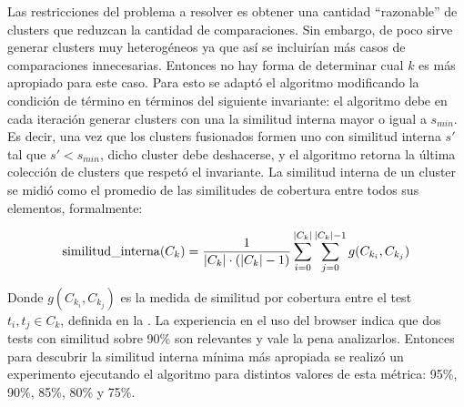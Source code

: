 
\par Las restricciones del problema a resolver es obtener una cantidad ``razonable'' de clusters que reduzcan la cantidad de comparaciones. Sin embargo, de poco sirve generar clusters muy heterogéneos ya que así se incluirían más casos de comparaciones innecesarias. Entonces no hay forma de determinar cual $k$ es más apropiado para este caso. Para esto se adaptó el algoritmo modificando la condición de término en términos del siguiente invariante: el algoritmo debe en cada iteración generar clusters con una la similitud interna mayor o igual a $s_{min}$. Es decir, una vez que los clusters fusionados formen uno con similitud interna $s'$ tal que $s' < s_{min}$, dicho cluster debe deshacerse, y el algoritmo retorna la última colección de clusters que respetó el invariante. La similitud interna de un cluster se midió como el promedio de las similitudes de cobertura entre todos sus elementos, formalmente:

\[ \textrm{similitud\_interna}(C_k) = \dfrac{1}{\vert C_k \vert\cdot(\vert C_k \vert-1)} \sum_{i=0}^{\vert C_k \vert} \sum_{j=0}^{\vert C_k \vert - 1} g(C_{k_i},C_{k_j} )\]

\par Donde $g(C_{k_i},C_{k_j})$ es la medida de similitud por cobertura entre el test $t_i, t_j \in C_{k}$, definida en la . La experiencia en el uso del browser indica que dos tests con similitud sobre 90\% son relevantes y vale la pena analizarlos. Entonces para descubrir la similitud interna mínima más apropiada se realizó un experimento ejecutando el algoritmo para distintos valores de esta métrica: 95\%, 90\%, 85\%, 80\% y 75\%. 



